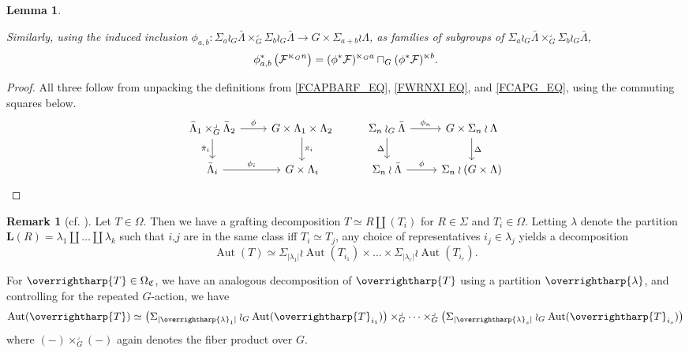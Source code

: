 \documentclass[a4paper,10pt
,draft
]{article}%
\numberwithin{equation}{section}
\numberwithin{figure}{section}
\newtheorem{lemma}[equation]{Lemma}%
\theoremstyle{definition} %
\newtheorem{remark}[equation]{Remark}%
\newcommand{\vect}[1]{\text{\overrightharp{\ensuremath{#1}}}}
\DeclareMathOperator{\Aut}{Aut}%
\newcommand{\F}{\ensuremath{\mathcal F}}
\newcommand{\1}{\ensuremath{\mathbbm 1}}%
\begin{document}
{\begin{lemma}
\begin{enumerate}[label=(\roman*)]
              Similarly, using the induced inclusion
              $\phi_{a,b} \colon \Sigma_a \wr_G \bar \Lambda \times_G^\lrcorner \Sigma_b \wr_G \bar \Lambda \to G \times \Sigma_{a+b} \wr \Lambda$,
              as families of subgroups of $\Sigma_a \wr_G \bar \Lambda \times_G^\lrcorner \Sigma_b \wr_G \bar \Lambda$,
              \[
                    \phi_{a,b}^{\**}\left(\F^{\ltimes_G n} \right) = (\phi^{\**} \F)^{\ltimes_G a} \sqcap_G (\phi^{\**} \F)^{\ltimes b}.
              \]
        \end{enumerate}
  \end{lemma}
  \begin{proof}
        All three follow from unpacking the definitions from \eqref{FCAPBARF_EQ}, \eqref{FWRNXI EQ}, and \eqref{FCAPG_EQ}, using the commuting squares below.
        \[
              \begin{tikzcd}
                    \bar \Lambda_1 \times_G^\lrcorner \bar \Lambda_2 \arrow[d, "\bar \pi_i"'] \arrow[r, "\phi"]
                    &
                    G \times \Lambda_1 \times \Lambda_2 \arrow[d, "\pi_i"]
                    & %
                    \Sigma_n \wr_G \bar \Lambda \arrow[d, "\Delta"'] \arrow[r, "\phi_n"]
                    &
                    G \times \Sigma_n \wr \Lambda \arrow[d, "\Delta"]
                    \\
                    \bar \Lambda_i \arrow[r, "\phi_i"]
                    &
                    G \times \Lambda_i
                    & %
                    \Sigma_n \wr \bar \Lambda \arrow[r, "\phi"]
                    &
                    \Sigma_n \wr (G \times \Lambda)
              \end{tikzcd}
        \]      
  \end{proof}

  \begin{remark}[{cf. \cite[Remark 6.48]{BP_geo}}]
        \label{AUTT_REM}
        Let $T \in \Omega$. Then we have a grafting decomposition $T \simeq R \amalg (T_i)$ for $R \in \Sigma$ and $T_i \in \Omega$.
        Letting $\lambda$ denote the partition $\boldsymbol{L}(R) = \lambda_1 \amalg \dots \amalg \lambda_k$ such that
        $i$,$j$ are in the same class iff $T_i \simeq T_j$,
        any choice of representatives $i_j \in \lambda_j$ yields a decomposition
        \[
              \Aut(T) \simeq \Sigma_{|\lambda_1|} \wr \Aut(T_{i_1}) \times \dots \times \Sigma_{|\lambda_r|} \wr \Aut(T_{i_r}).
        \]
        
        For $\vect T \in \Omega_{\mathfrak C}$, we have an analogous decomposition of $\vect T$ using a partition $\vect \lambda$,
        and controlling for the repeated $G$-action, we have
        \[
              \Aut(\vect T) \simeq \big(\Sigma_{|\vect \lambda_1|} \wr_G \Aut(\vect T_{i_1})\big) \times_G^\lrcorner \dots \times_G^\lrcorner \big(\Sigma_{|\vect \lambda_s|} \wr_G \Aut(\vect T_{i_s})\big)
        \]
        where $(-) \times_G^\lrcorner (-)$ again denotes the fiber product over $G$.


\end{remark}}
\end{document}
